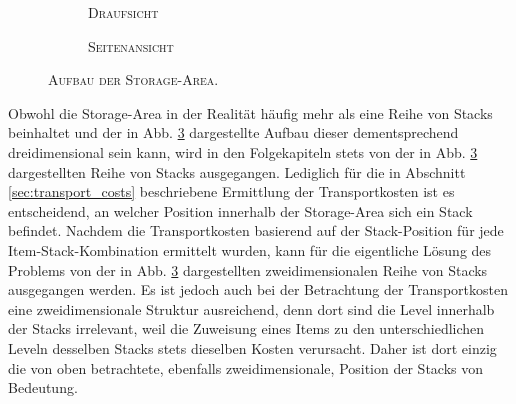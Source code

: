\begin{figure}[H]
\centering

\begin{subfigure}[b]{\textwidth}
\centering
{}
\caption{\textsc{Draufsicht}}
\label{fig:topview}
\end{subfigure}
\par\bigskip
\begin{subfigure}[b]{\textwidth}
\centering
{}
\caption{\textsc{Seitenansicht}}
\label{fig:sideview}
\end{subfigure}

\caption{\textsc{Aufbau der Storage-Area}.}
\label{fig:storage_area}
\end{figure}

\vfill
\pagebreak

Obwohl die Storage-Area in der Realität häufig mehr als eine Reihe von Stacks beinhaltet und der in
Abb. \ref{fig:storage_area} dargestellte Aufbau dieser dementsprechend dreidimensional sein kann,
wird in den Folgekapiteln stets von der in Abb. \ref{fig:storage_area} dargestellten Reihe von Stacks ausgegangen.
Lediglich für die in Abschnitt \ref{sec:transport_costs} beschriebene Ermittlung der Transportkosten ist es entscheidend,
an welcher Position innerhalb der Storage-Area sich ein Stack befindet. Nachdem die Transportkosten basierend auf der
Stack-Position für jede Item-Stack-Kombination ermittelt wurden, kann für die eigentliche Lösung des Problems von
der in Abb. \ref{fig:storage_area} dargestellten zweidimensionalen Reihe von Stacks ausgegangen werden.
Es ist jedoch auch bei der Betrachtung der Transportkosten eine zweidimensionale Struktur ausreichend, denn dort sind
die Level innerhalb der Stacks irrelevant, weil die Zuweisung eines Items zu den unterschiedlichen Leveln
desselben Stacks stets dieselben Kosten verursacht. Daher ist dort einzig die von oben betrachtete, ebenfalls zweidimensionale,
Position der Stacks von Bedeutung.


